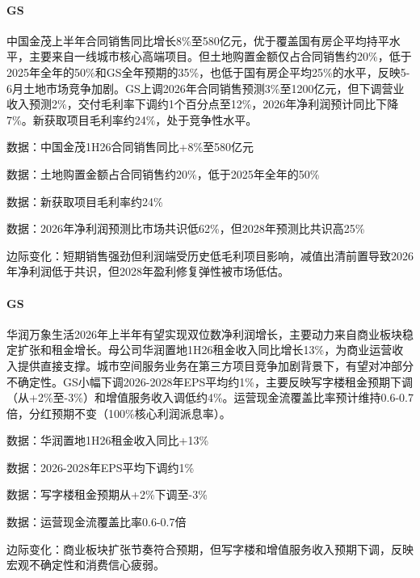 \documentclass[11pt]{ctexart}
\begin{document}
\paragraph{GS} 中国金茂上半年合同销售同比增长8\%至580亿元，优于覆盖国有房企平均持平水平，主要来自一线城市核心高端项目。但土地购置金额仅占合同销售约20\%，低于2025年全年的50\%和GS全年预期的35\%，也低于国有房企平均25\%的水平，反映5-6月土地市场竞争加剧。GS上调2026年合同销售预测3\%至1200亿元，但下调营业收入预测2\%，交付毛利率下调约1个百分点至12\%，2026年净利润预计同比下降7\%。新获取项目毛利率约24\%，处于竞争性水平。
{\small\color{refgray}数据：中国金茂1H26合同销售同比+8\%至580亿元\par}
{\small\color{refgray}数据：土地购置金额占合同销售约20\%，低于2025年全年的50\%\par}
{\small\color{refgray}数据：新获取项目毛利率约24\%\par}
{\small\color{refgray}数据：2026年净利润预测比市场共识低62\%，但2028年预测比共识高25\%\par}
{\small\color{refgray}边际变化：短期销售强劲但利润端受历史低毛利项目影响，减值出清前置导致2026年净利润低于共识，但2028年盈利修复弹性被市场低估。\par}
\paragraph{GS} 华润万象生活2026年上半年有望实现双位数净利润增长，主要动力来自商业板块稳定扩张和租金增长。母公司华润置地1H26租金收入同比增长13\%，为商业运营收入提供直接支撑。城市空间服务业务在第三方项目竞争加剧背景下，有望对冲部分不确定性。GS小幅下调2026-2028年EPS平均约1\%，主要反映写字楼租金预期下调（从+2\%至-3\%）和增值服务收入调低约4\%。运营现金流覆盖比率预计维持0.6-0.7倍，分红预期不变（100\%核心利润派息率）。
{\small\color{refgray}数据：华润置地1H26租金收入同比+13\%\par}
{\small\color{refgray}数据：2026-2028年EPS平均下调约1\%\par}
{\small\color{refgray}数据：写字楼租金预期从+2\%下调至-3\%\par}
{\small\color{refgray}数据：运营现金流覆盖比率0.6-0.7倍\par}
{\small\color{refgray}边际变化：商业板块扩张节奏符合预期，但写字楼和增值服务收入预期下调，反映宏观不确定性和消费信心疲弱。\par}
\end{document}
